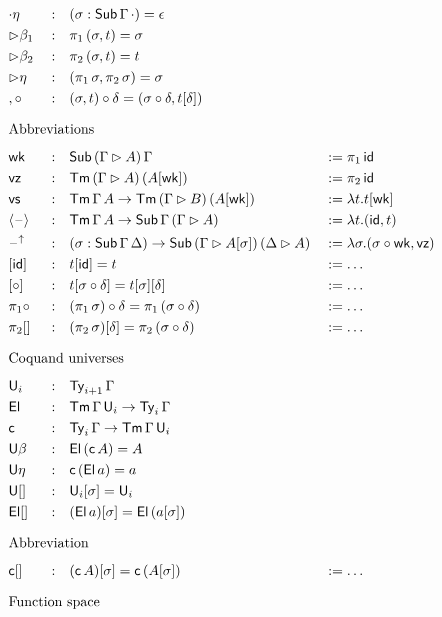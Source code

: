 \documentclass{article}
\begin{document}
\begin{alignat*}{5}
  & {\cdot\eta} && : && (\sigma : \Tms\,\Gamma\,\cdot) = \epsilon \\
  & {\rhd\beta_1} && : && \pi_1\,(\sigma, t) = \sigma \\
  & {\rhd\beta_2} && : && \pi_2\,(\sigma, t) = t \\
  & {\rhd\eta} && : && (\pi_1\,\sigma, \pi_2\,\sigma) = \sigma \\
  & {,\circ} && : && (\sigma, t)\circ\delta = (\sigma\circ\delta, t[\delta]) \\
  & \heading{Abbreviations} \\
  & \wk && : && \Tms\,(\Gamma\rhd A)\,\Gamma && := \pi_1\,\id \\
  & \vz && : && \Tm\,(\Gamma\rhd A)\,(A[\wk]) && := \pi_2\,\id \\
  & \vs && : && \Tm\,\Gamma\,A\ra\Tm\,(\Gamma\rhd B)\,(A[\wk]) && := \lambda t.t[\wk] \\
  & \lb\blank\rb && : && \Tm\,\Gamma\,A\ra\Tms\,\Gamma\,(\Gamma\rhd A) && := \lambda t.(\id, t) \\
  & \blank^\uparrow && : && (\sigma:\Tms\,\Gamma\,\Delta)\ra\Tms\,(\Gamma\rhd A[\sigma])\,(\Delta\rhd A) && := \lambda\sigma.(\sigma\circ\wk, \vz) \\
  & [\id] && : && t[\id] = t && := \dots \\
  & [\circ] && : && t[\sigma\circ\delta] = t[\sigma][\delta] && := \dots \\
  & {\pi_1\circ} && : && (\pi_1\,\sigma)\circ\delta = \pi_1\,(\sigma\circ\delta) && := \dots \\
  & {\pi_2[]} && : && (\pi_2\,\sigma)[\delta] = \pi_2\,(\sigma\circ\delta) && := \dots \\
  & \heading{Coquand universes} \\
  & \U_i && : && \Ty_{i+1}\,\Gamma \\
  & \El && : && \Tm\,\Gamma\,\U_i \ra \Ty_i\,\Gamma \\
  & \c && : && \Ty_i\,\Gamma\ra\Tm\,\Gamma\,\U_i \\
  & {\U\beta} && : && \El\,(\c\,A) = A \\
  & {\U\eta} && : && \c\,(\El\,a) = a \\
  & {\U[]} && : && \U_i[\sigma] = \U_i \\
  & {\El[]} && : && (\El\,a)[\sigma] = \El\,(a[\sigma]) \\
  & \heading{Abbreviation} \\
  & {\c[]} && : && (\c\,A)[\sigma] = \c\,(A[\sigma]) && := \dots \\
  & \heading{Function space} \\

\end{alignat*}
\end{document}
